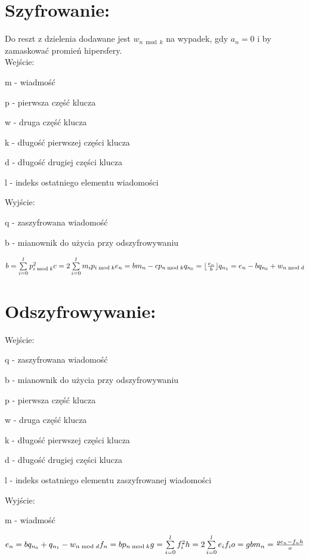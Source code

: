 \documentclass[11pt]{article}
\newcommand{\floor}[1]{\lfloor #1 \rfloor}
\begin{document}
	\section{Szyfrowanie:}
	Do reszt z dzielenia dodawane jest \ensuremath{w_{n\bmod{k}}} na wypadek, gdy \ensuremath{a_n = 0} i by zamaskować promień hipersfery. \\
	Wejście:
	\begin{description}
	\item m - wiadmość
	\item p - pierwsza część klucza
	\item w - druga część klucza
	\item k - długość pierwszej części klucza
	\item d - długość drugiej części klucza
	\item l - indeks ostatniego elementu wiadomości
	\end{description}
	Wyjście:
	\begin{description}
	\item q - zaszyfrowana wiadomość
	\item b - mianownik do użycia przy odszyfrowywaniu
	\end{description} 
	\ensuremath {
		b = \sum\limits_{i=0}^l p_{i \bmod{k}}^2 \\
		c = 2\sum\limits_{i=0}^l m_ip_{i \bmod{k}} \\
		e_n = bm_n - cp_{n \bmod{k}} \\
		q_{n_0} = \floor{\frac{e_n}{b}}  \\
		q_{n_1} = e_n  - bq_{n_0} + w_{n\bmod{d}} 
	}
	\newpage
	\section{Odszyfrowywanie:}
	Wejście:
	\begin{description}
	\item q - zaszyfrowana wiadomość
	\item b - mianownik do użycia przy odszyfrowywaniu
	\item p - pierwsza część klucza
	\item w - druga część klucza
	\item k - długość pierwszej części klucza
	\item d - długość drugiej części klucza
	\item l - indeks ostatniego elementu zaszyfrowanej wiadomości
	\end{description} 
	Wyjście:
	\begin{description}
	\item m - wiadmość
	\end{description}
	\ensuremath {
		e_n = bq_{n_0} + q_{n_1} - w_{n\bmod{d}} \\
		f_n = bp_{n \bmod{k}} \\
		g = \sum\limits_{i=0}^l f_i^2 \\
		h = 2\sum\limits_{i=0}^l e_if_i \\
		o = gb \\
		m_n = \frac{ge_n - f_nh}{o}
	}
\end{document}
